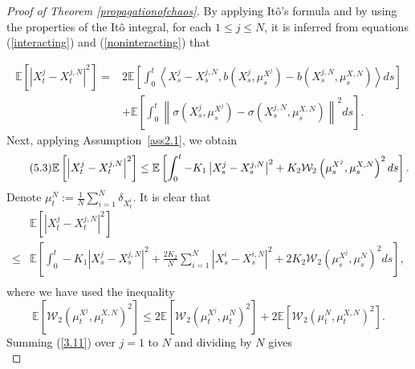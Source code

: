 \documentclass[12pt]{article}
\numberwithin{equation}{section}
\begin{document}
\begin{proof}[Proof of Theorem \ref{propagationofchaos}]
By applying It{\^o}'s formula and by using the properties of the It{\^o} integral, for each $1 \leq j \leq N$, it is inferred from equations (\ref{interacting}) and (\ref{noninteracting}) that

\begin{equation}\tag{5.2}\label{3.9}
\begin{aligned}
\mathbb{E}\left[\left|X_{t} ^j-X_{t}^{j, N}\right|^2\right]= & 2 \mathbb{E}\left[\int_0^{t}\left\langle X_s^j-X_s^{j, N}, b\left(X_s^j, \mu_s^{X^j}\right)-b\left(X_s^{j, N}, \mu_s^{X, N}\right)\right\rangle d s \right]\\
& +\mathbb{E}\left[\int_0^{t}\left\|\sigma\left(X_s^j, \mu_s^{X^j}\right)-\sigma\left(X_s^{j, N}, \mu_s^{X, N}\right)\right\|^2 d s\right].
\end{aligned}
\end{equation}
Next, applying Assumption~\ref{ass2.1}, we obtain
\begin{equation}\tag{5.3}\label{3.10}
\mathbb{E}\left[\left|X_{t} ^j-X_{t}^{j, N}\right|^2\right]\leq \mathbb{E}\left[\int_0^{t}-K_1 \left|X_s^j-X_s^{j, N}\right|^2+K_2 \mathcal{W}_2\left(\mu_s^{X^j}, \mu_s^{X, N}\right)^2 d s \right].\\
\end{equation}
Denote $\mu_t^N:=\tfrac{1}{N} \sum_{i=1}^N \delta_{X_t^i}$.  It is clear that
\begin{equation}\tag{5.4}\label{3.11}
\begin{aligned}
& \mathbb{E}\left[\left|X_t^j-X_t^{j, N}\right|^2 \right] \\
\leq &\mathbb{E}\left[\int_0^{t} -K_1 \left|X_s^j-X_s^{j, N}\right|^2 +\tfrac{2 K_2}{N} \sum_{i=1}^N \left|X_s^i-X_s^{i, N}\right|^2  +2 K_2 \mathcal{W}_2\left(\mu_s^{X^j}, \mu_s^N\right)^2 d s\right],\\
\end{aligned}
\end{equation}
where we have used the inequality 
\begin{equation}\tag{5.5}\label{3.12}
\mathbb{E}\left[\mathcal{W}_2\left(\mu_t^{X^j}, \mu_t^{X, N}\right)^2\right] \leq 2 \mathbb{E}\left[\mathcal{W}_2\left(\mu_t^{X^j}, \mu_t^N\right)^2\right]+2 \mathbb{E}\left[\mathcal{W}_2\left(\mu_t^N, \mu_t^{X, N}\right)^2\right].
\end{equation}
Summing (\ref{3.11}) over $j = 1$ to $N$  and dividing by $ N $ gives
\begin{equation}\tag{5.6}\label{3.13}

\end{equation}
\end{proof}
\end{document}
